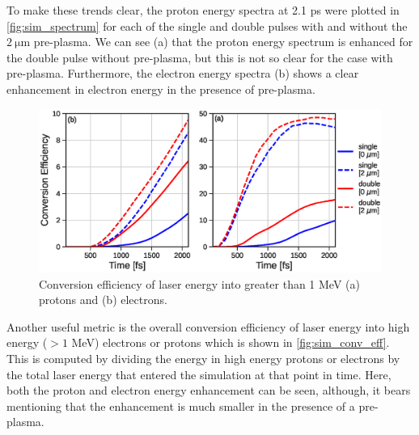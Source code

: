 To make these trends clear, the proton energy spectra at 2.1 ps were plotted in \autoref{fig:sim_spectrum} for each of the single and double pulses with and without the $\SI{2}{\micro \meter}$ pre-plasma. We can see (a) that the proton energy spectrum is enhanced for the double pulse without pre-plasma, but this is not so clear for the case with pre-plasma. Furthermore, the electron energy spectra (b) shows a clear enhancement in electron energy in the presence of pre-plasma. 

\begin{figure}
	\centering
	\includegraphics[width=0.9\linewidth]{planning/images/titan/conversion_efficiency.eps}
	\caption{Conversion efficiency of laser energy into greater than 1 MeV (a) protons and (b) electrons.}
	\label{fig:sim_conv_eff}
\end{figure}

Another useful metric is the overall conversion efficiency of laser energy into high energy ($> 1 $ MeV) electrons or protons which is shown in \autoref{fig:sim_conv_eff}. This is computed by dividing the energy in high energy protons or electrons by the total laser energy that entered the simulation at that point in time. Here, both the proton and electron energy enhancement can be seen, although, it bears mentioning that the enhancement is much smaller in the presence of a pre-plasma. 

